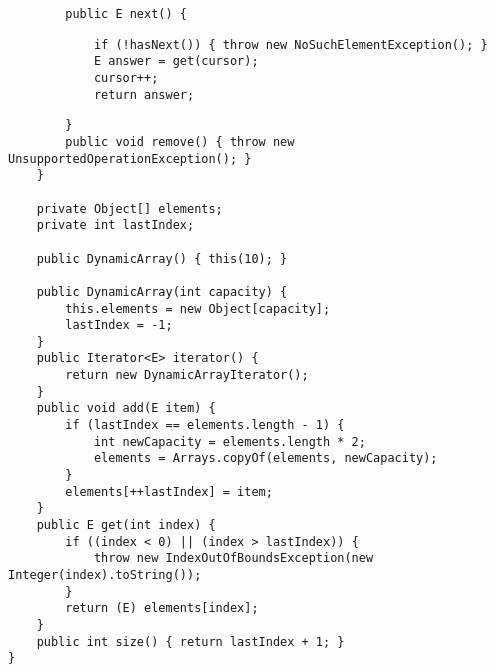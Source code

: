 \documentclass[answers,addpoints,9pt]{exam}
\begin{document}
\begin{questions}
\begin{verbatim}
        public E next() {
\end{verbatim}
\ifprintanswers
\begin{lstlisting}
            if (!hasNext()) { throw new NoSuchElementException(); }
            E answer = get(cursor);
            cursor++;
            return answer;
\end{lstlisting}
\else
\vspace{.4in}
\fi
\begin{verbatim}
        }
        public void remove() { throw new UnsupportedOperationException(); }
    }

    private Object[] elements;
    private int lastIndex;

    public DynamicArray() { this(10); }

    public DynamicArray(int capacity) {
        this.elements = new Object[capacity];
        lastIndex = -1;
    }
    public Iterator<E> iterator() {
        return new DynamicArrayIterator();
    }
    public void add(E item) {
        if (lastIndex == elements.length - 1) {
            int newCapacity = elements.length * 2;
            elements = Arrays.copyOf(elements, newCapacity);
        }
        elements[++lastIndex] = item;
    }
    public E get(int index) {
        if ((index < 0) || (index > lastIndex)) {
            throw new IndexOutOfBoundsException(new Integer(index).toString());
        }
        return (E) elements[index];
    }
    public int size() { return lastIndex + 1; }
}
\end{verbatim}



\end{questions}
\end{document}
